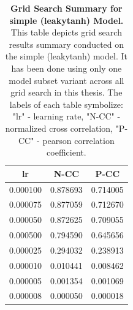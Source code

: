 \begin{table}
    \centering\footnotesize\sf
    \begin{tabular}{ccc}
    \toprule
    lr & N-CC & P-CC \\
    \midrule
    0.000100 & 0.878693 & 0.714005 \\
    0.000075 & 0.877059 & 0.712670 \\
    0.000050 & 0.872625 & 0.709055 \\
    0.000500 & 0.794590 & 0.645656 \\
    0.000025 & 0.294032 & 0.238913 \\
    0.000010 & 0.010441 & 0.008462 \\
    0.000005 & 0.001354 & 0.001069 \\
    0.000008 & 0.000050 & 0.000018 \\
    \bottomrule
    \end{tabular}
    \caption{\textbf{Grid Search Summary for simple (leakytanh) Model.} This table depicts grid search results summary conducted on the simple (leakytanh) model. It has been done using only one model subset variant across all grid search in this thesis. The labels of each table symbolize: "lr" - learning rate, "N-CC" - normalized cross correlation, "P-CC" - pearson correlation coefficient.}
    \label{tab:grid_simple_leakytanh}
\end{table}

